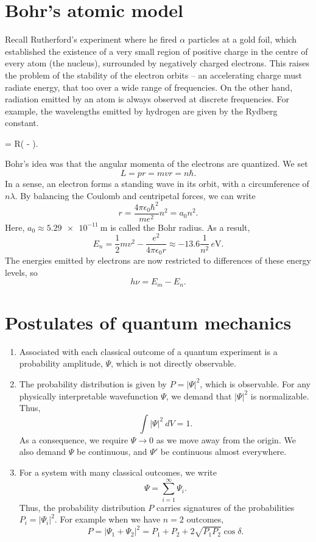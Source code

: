 \documentclass[11pt]{article}
\theoremstyle{definition}
\newenvironment{boxedeq*}%
    {\begin{equationbox}\begin{equation*}}%
    {\end{equation*}\end{equationbox}}
\theoremstyle{remark}
\numberwithin{equation}{section}
\begin{document}
    \section{Bohr's atomic model}
    Recall Rutherford's experiment where he fired $\alpha$ particles at a gold
    foil, which established the existence of a very small region of positive charge
    in the centre of every atom (the nucleus), surrounded by negatively charged
    electrons. This raises the problem of the stability of the electron orbits -- an
    accelerating charge must radiate energy, that too over a wide range of
    frequencies. On the other hand, radiation emitted by an atom is always observed
    at discrete frequencies. For example, the wavelengths emitted by hydrogen are 
    given by the Rydberg constant.
    \begin{boxedeq*}
         = R\left( - \right).
    \end{boxedeq*}
    Bohr's idea was that the angular momenta of the electrons are quantized. We set
    \[
        L = pr = mvr = n\hbar.
    \] In a sense, an electron forms a standing wave in its orbit, with a
    circumference of $n\lambda$. By balancing the Coulomb and centripetal forces, we
    can write \[
        r = \frac{4\pi\epsilon_0 \hbar^2}{me^2}n^2 = a_0n^2.
    \] Here, $a_0 \approx \SI{5.29e-11}{\meter}$ is called the Bohr radius.
    As a result, \[
        E_n = \frac{1}{2}mv^2 - \frac{e^2}{4\pi\epsilon_0 r} 
            \approx -13.6 \frac{1}{n^2}\,\si{e\volt}.
    \] The energies emitted by electrons are now restricted to differences of these
    energy levels, so \[
        h\nu = E_m - E_n.
    \] 

    \section{Postulates of quantum mechanics}
    \begin{enumerate}
        \item Associated with each classical outcome of a quantum experiment is a
        probability amplitude, $\Psi$, which is not directly observable.
        \item The probability distribution is given by $P = |\Psi|^2$, which is
        observable. For any physically interpretable wavefunction $\Psi$, we demand
        that $|\Psi|^2$ is normalizable. Thus, \[
            \int |\Psi|^2 \:dV = 1.
        \] As a consequence, we require $\Psi \to 0$ as we move away from the
        origin. We also demand $\Psi$ be continuous, and $\Psi'$ be continuous
        almost everywhere.
        \item For a system with many classical outcomes, we write \[
            \Psi = \sum_{i = 1}^\infty \Psi_i.
        \] Thus, the probability distribution $P$ carries signatures of the
        probabilities $P_i = |\Psi_i|^2$. For example when we have $n = 2$ 
        outcomes, \[
            P = |\Psi_1 + \Psi_2|^2 = P_1 + P_2 + 2\sqrt{P_1P_2}\cos\delta.
        \] 
    \end{enumerate}
\end{document}
